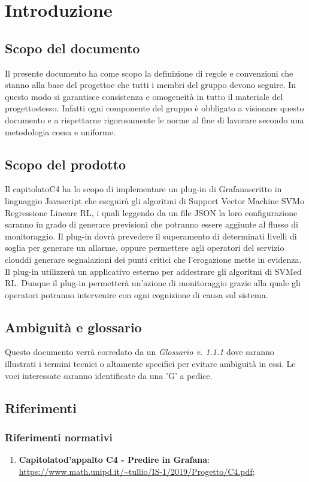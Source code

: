 \section{Introduzione}
\subsection{Scopo del documento}
Il presente documento ha come scopo la definizione di regole e convenzioni che stanno alla base del progetto\glosp e che tutti i membri del gruppo devono seguire. In questo modo si garantisce consistenza e omogeneità in tutto il materiale del progetto\glosp stesso. Infatti ogni componente del gruppo è obbligato a visionare questo documento e a rispettarne rigorosamente le norme al fine di lavorare secondo una metodologia coesa e uniforme.
\subsection{Scopo del prodotto}
Il capitolato\glosp C4 ha lo scopo di implementare un plug-in di Grafana\glosp scritto in linguaggio Javascript che eseguirà gli algoritmi di Support Vector Machine SVM\glosp o Regressione Lineare RL\glo, i quali leggendo da un file JSON la loro configurazione saranno in grado di generare previsioni che potranno essere aggiunte al flusso di monitoraggio. Il plug-in dovrà prevedere il superamento di determinati livelli di soglia per generare un allarme, oppure permettere agli operatori del servizio cloud\glosp di generare segnalazioni dei punti critici che l'erogazione mette in evidenza. Il plug-in utilizzerà un applicativo esterno per addestrare gli algoritmi di SVM\glosp ed RL\glo.
Dunque il plug-in permetterà un'azione di monitoraggio grazie alla quale gli operatori potranno intervenire con ogni cognizione di causa sul sistema.
\subsection{Ambiguità e glossario}
Questo documento verrà corredato da un \textit{Glossario v. 1.1.1} dove saranno illustrati i termini tecnici o altamente specifici per evitare ambiguità in essi. Le voci interessate saranno identificate da una 'G' a pedice.
\subsection{Riferimenti}
\subsubsection{Riferimenti normativi}
\begin{enumerate}
	\item \textbf{Capitolato}\glosp \textbf{d'appalto C4 - Predire in Grafana}\glo: \url{https://www.math.unipd.it/~tullio/IS-1/2019/Progetto/C4.pdf};
\end{enumerate}
